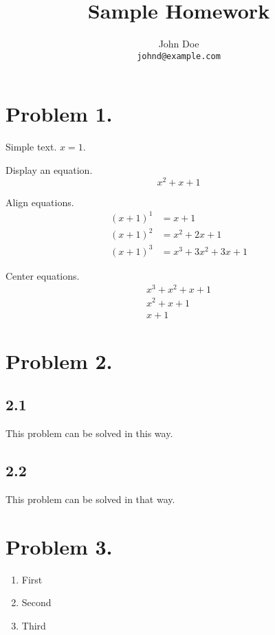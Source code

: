 \documentclass[a4paper,11pt]{article}
\begin{document}
\title{Sample Homework}
\author{John Doe \\ \texttt{johnd@example.com}}
\maketitle

\section*{Problem 1.}

Simple text. $x = 1$.

Display an equation.
\[
  x^2 + x + 1
\]

Align equations.
\begin{align*}
  {(x + 1)}^1 &= x + 1 \\
  {(x + 1)}^2 &= x^2 + 2x + 1 \\
  {(x + 1)}^3 &= x^3 + 3x^2 + 3x + 1
\end{align*}

Center equations.
\begin{gather*}
  x^3 + x^2 + x + 1 \\
  x^2 + x + 1 \\
  x + 1
\end{gather*}

\section*{Problem 2.}

\subsection*{2.1}

This problem can be solved in this way.

\subsection*{2.2}

This problem can be solved in that way.

\section*{Problem 3.}

\begin{enumerate}[label=(\alph*)]
  \item First

  \item Second

  \item Third
\end{enumerate}
\end{document}
